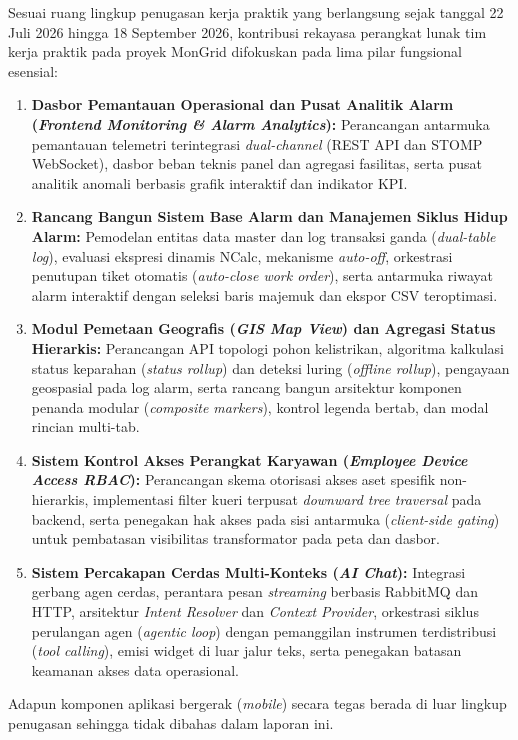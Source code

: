 Sesuai ruang lingkup penugasan kerja praktik yang berlangsung sejak tanggal 22 Juli 2026 hingga 18 September 2026, kontribusi rekayasa perangkat lunak tim kerja praktik pada proyek MonGrid difokuskan pada lima pilar fungsional esensial:
\begin{enumerate}[label=\arabic*., leftmargin=*, itemsep=0pt]
  \item \textbf{Dasbor Pemantauan Operasional dan Pusat Analitik Alarm (\textit{Frontend Monitoring \& Alarm Analytics}):} Perancangan antarmuka pemantauan telemetri terintegrasi \textit{dual-channel} (REST API dan STOMP WebSocket), dasbor beban teknis panel dan agregasi fasilitas, serta pusat analitik anomali berbasis grafik interaktif dan indikator KPI.
  \item \textbf{Rancang Bangun Sistem Base Alarm dan Manajemen Siklus Hidup Alarm:} Pemodelan entitas data master dan log transaksi ganda (\textit{dual-table log}), evaluasi ekspresi dinamis NCalc, mekanisme \textit{auto-off}, orkestrasi penutupan tiket otomatis (\textit{auto-close work order}), serta antarmuka riwayat alarm interaktif dengan seleksi baris majemuk dan ekspor CSV teroptimasi.
  \item \textbf{Modul Pemetaan Geografis (\textit{GIS Map View}) dan Agregasi Status Hierarkis:} Perancangan API topologi pohon kelistrikan, algoritma kalkulasi status keparahan (\textit{status rollup}) dan deteksi luring (\textit{offline rollup}), pengayaan geospasial pada log alarm, serta rancang bangun arsitektur komponen penanda modular (\textit{composite markers}), kontrol legenda bertab, dan modal rincian multi-tab.
  \item \textbf{Sistem Kontrol Akses Perangkat Karyawan (\textit{Employee Device Access RBAC}):} Perancangan skema otorisasi akses aset spesifik non-hierarkis, implementasi filter kueri terpusat \textit{downward tree traversal} pada backend, serta penegakan hak akses pada sisi antarmuka (\textit{client-side gating}) untuk pembatasan visibilitas transformator pada peta dan dasbor.
  \item \textbf{Sistem Percakapan Cerdas Multi-Konteks (\textit{AI Chat}):} Integrasi gerbang agen cerdas, perantara pesan \textit{streaming} berbasis RabbitMQ dan HTTP, arsitektur \textit{Intent Resolver} dan \textit{Context Provider}, orkestrasi siklus perulangan agen (\textit{agentic loop}) dengan pemanggilan instrumen terdistribusi (\textit{tool calling}), emisi widget di luar jalur teks, serta penegakan batasan keamanan akses data operasional.
\end{enumerate}
Adapun komponen aplikasi bergerak (\textit{mobile}) secara tegas berada di luar lingkup penugasan sehingga tidak dibahas dalam laporan ini.

